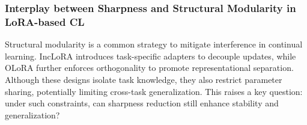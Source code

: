 \documentclass[letterpaper]{article} %
\begin{document}
\subsubsection{Interplay between Sharpness and Structural Modularity in LoRA-based CL}








Structural modularity is a common strategy to mitigate interference in continual learning. IncLoRA introduces task-specific adapters to decouple updates, while OLoRA further enforces orthogonality to promote representational separation. Although these designs isolate task knowledge, they also restrict parameter sharing, potentially limiting cross-task generalization. This raises a key question: under such constraints, can sharpness reduction still enhance stability and generalization?
\end{document}
